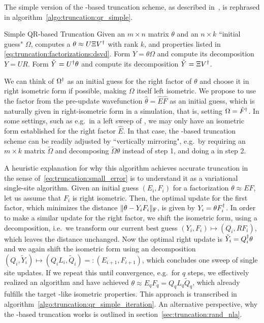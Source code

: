 The simple version of the -based truncation scheme, as described in~\cite[sec II]{unfried2023}, is rephrased in algorithm~\ref{algo:truncation:qr_simple}.

\begin{Algorithm}{Simple QR-based Truncation}{
    \label{algo:truncation:qr_simple}
    Given an $m \times n$ matrix $\theta$ and an $n \times k$ ``initial guess" $\Omega$, computes a  $\theta \approx U \Xi V^\dagger$ with rank $k$, and properties listed in \eqref{eq:truncation:factorizations:dsvd}.
}
    \step Form $Y = \theta \Omega$ and compute its  decomposition $Y = U R$.
    \step Form $\tilde Y = U^\dagger \theta$ and compute its  decomposition $\tilde Y = \Xi V^\dagger$.
\end{Algorithm}

We can think of $\Omega^\dagger$ as an initial guess for the right factor of $\theta$ and choose it in right isometric form if possible, making $\Omega$ itself left isometric.
%
We propose to use the factor from the pre-update wavefunction $\hat\theta = \hat{E}\hat{F}$ as an initial guess, which is naturally given in right-isometric form in a  simulation, that is, setting $\Omega = \hat{F}^\dagger$.
%
In some settings, such as e.g.~in a left sweep of , we may only have an isometric form established for the right factor $\hat{E}$.
%
In that case, the -based truncation scheme can be readily adjusted by ``vertically mirroring", e.g.~by requiring an $m \times k$ matrix $\tilde \Omega$ and  decomposing $\tilde \Omega\theta$ instead of step 1, and doing a  in step 2.

A heuristic explanation for why this algorithm achieves accurate truncation in the sense of~\eqref{eq:truncation:small_error} is to understand it as a variational single-site algorithm.
%
Given an initial guess $(E_i, F_i)$ for a factorization $\theta \approx E F$, let us assume that $F_i$ is right isometric.
%
Then, the optimal update for the first factor, which minimizes the distance $\Fnorm{\theta - Y_i F_i}$, is given by $Y_i = \theta F_i^\dagger$.
%
In order to make a similar update for the right factor, we shift the isometric form, using a  decomposition, i.e.~we transform our current best guess $(Y_i, F_i) \mapsto (Q_i, R F_i)$, which leaves the distance unchanged.
%
Now the optimal right update is $\tilde Y_i = Q_i^\dagger\theta$ and we again shift the isometric form using an  decomposition $(Q_i, \tilde Y_i) \mapsto (Q_i L_i, \tilde Q_i) =: (E_{i+1}, F_{i+1})$, which concludes one sweep of single site updates.
%
If we repeat this until convergence, e.g.~for $q$ steps, we effectively realized an  algorithm and have achieved $\theta \approx E_q F_q = Q_q L_q \tilde Q_q$, which already fulfills the target -like isometric properties.
%
This approach is transcribed in algorithm~\ref{algo:truncation:qr_simple_iteration}.
%
An alternative perspective, why the -based truncation works is outlined in section~\ref{sec:truncation:rand_nla}.

